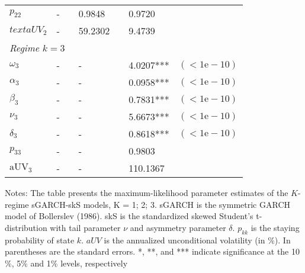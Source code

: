 \documentclass[12pt,a4paper]{article}
\begin{document}
\begin{table}[tb]
\begin{threeparttable}
\begin{tabular}{lllllll}
$p_22$         & -                &                & 0.9848         &               & 0.9720     &                     \\
$text{aUV}_2$  & -                &                & 59.2302        &               & 9.4739     &                     \\ \hline
\multicolumn{6}{l}{\textit{Regime $k=3$}}                                                        &                     \\
$\omega_3$     & -                &                & -              &               & 4.0207***  & $(<1\mathrm{e}-10)$ \\
$\alpha_3$     & -                &                & -              &               & 0.0958***  & $(<1\mathrm{e}-10)$ \\
$\beta_3$      & -                &                & -              &               & 0.7831***  & $(<1\mathrm{e}-10)$ \\
$\nu_3$        & -                &                & -              &               & 5.6673***  & $(<1\mathrm{e}-10)$ \\
$\delta_3$     & -                &                & -              &               & 0.8618***  & $(<1\mathrm{e}-10)$ \\
$p_33$         & -                &                & -              &               & 0.9803     &                     \\
$\text{aUV}_3$ & -                &                & -              &               & 110.1367   &                     \\ \hline
\end{tabular}
\begin{tablenotes}
\small
\item Notes: The table presents the maximum-likelihood parameter estimates of the $K$-regime sGARCH-skS models, K = 1; 2; 3. sGARCH is the symmetric GARCH model of Bollerslev (1986). skS is the standardized skewed Student's t-distribution with tail parameter $\nu$ and asymmetry parameter $\delta$. $p_{kk}$ is the staying probability of state $k$. $aUV$ is the annualized unconditional volatility (in $\%$). In parentheses are the standard errors. *, **, and *** indicate significance at the 10$\%$, 5$\%$ and 1$\%$ levels, respectively
\end{tablenotes}
\end{threeparttable}
\end{table}
\end{document}
